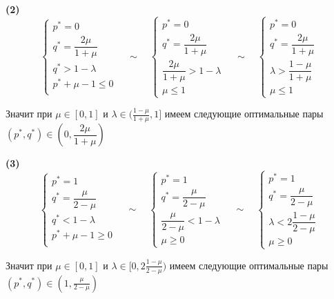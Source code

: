 \textbf{(2)}
$$
	\begin{cases}
		p^* = 0 \\
		q^* = \dfrac{2\mu}{1+\mu} \\
		q^* > 1 - \lambda \\
		p^* + \mu - 1 \leqslant 0 \\
	\end{cases}
	\quad \sim \quad
	\begin{cases}
		p^* = 0 \\
		q^* = \dfrac{2\mu}{1+\mu} \\
		\dfrac{2\mu}{1+\mu} > 1 - \lambda \\
		\mu \leqslant 1
	\end{cases}
	\quad \sim \quad
	\begin{cases}
		p^* = 0 \\
		q^* = \dfrac{2\mu}{1+\mu} \\
		\lambda > \dfrac{1-\mu}{1+\mu} \\
		\mu \leqslant 1
	\end{cases}
$$

Значит при $\mu \in [0, 1]$ и $\lambda \in (\frac{1-\mu}{1+\mu}, 1]$
имеем следующие оптимальные пары
$(p^*, q^*) \in (0, \dfrac{2\mu}{1 + \mu})$

\hspace{5mm}

\textbf{(3)}
$$
	\begin{cases}
		p^* = 1 \\
		q^* = \dfrac{\mu}{2-\mu} \\
		q^* < 1 - \lambda \\
		p^* + \mu - 1 \geqslant 0 \\
	\end{cases}
	\quad \sim \quad
	\begin{cases}
		p^* = 1 \\
		q^* = \dfrac{\mu}{2-\mu} \\
		\dfrac{\mu}{2-\mu} < 1 - \lambda \\
		\mu \geqslant 0
	\end{cases}
	\quad \sim \quad
	\begin{cases}
		p^* = 1 \\
		q^* = \dfrac{\mu}{2-\mu} \\
		\lambda < 2\dfrac{1-\mu}{2-\mu} \\
		\mu \geqslant 0
	\end{cases}
$$

Значит при $\mu \in [0, 1]$ и $\lambda \in [0, 2\frac{1-\mu}{2-\mu})$
имеем следующие оптимальные пары
$ (p^*, q^*) \in (1, \frac{\mu}{2 - \mu})$

